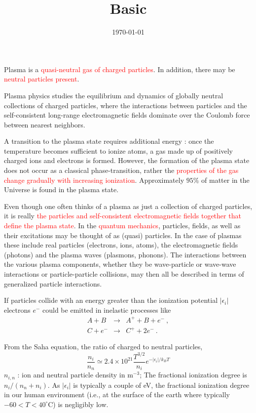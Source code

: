 \documentclass[12pt,a4paper]{article}
\title{Basic}
\author{}
\date{\today}
\begin{document}
\maketitle
Plasma is a \textcolor{red}{quasi-neutral gas of charged particles}. In addition, there may be \textcolor{red}{neutral particles present}.

\cite{2015bps..book.....C} Plasma physics studies the equilibrium and dynamics of globally neutral collections of charged particles, where the interactions between particles and the self-consistent long-range electromagnetic fields dominate over the Coulomb force between nearest neighbors.

A transition to the plasma state requires additional energy : once the temperature becomes sufficient to ionize atoms, a gas made up of positively charged ions and electrons is formed. However, the formation of the plasma state does not occur as a classical phase-transition, rather the \textcolor{red}{properties of the gas change gradually with increasing ionization}. Approximately $95 \%$ of matter in the Universe is found in the plasma state.

Even though one often thinks of a plasma as just a collection of charged particles, it is really \textcolor{red}{the particles and self-consistent electromagnetic fields together that define the plasma state}. In the \textcolor{red}{quantum mechanics}, particles, fields, as well as their excitations may be thought of as (quasi) particles. In the case of plasmas these include real particles (electrons, ions, atoms), the electromagnetic fields (photons) and the plasma waves (plasmons, phonons). The interactions between the various plasma components, whether they be wave-particle or wave-wave interactions or particle-particle collisions, may then all be described in terms of generalized particle interactions. 

If particles collide with an energy greater than the ionization potential $|\epsilon_i|$ electrons $e^-$ could be emitted in inelastic processes like
\begin{eqnarray*}
A + B &\rightarrow& A^+ + B + e^- ~, \\
C + e^- &\rightarrow& C^+ + 2e^- ~.
\end{eqnarray*}

From the Saha equation, the ratio of charged to neutral particles,
\begin{equation*}
\frac{n_i}{n_n} \simeq 2.4 \times 10^{21} \frac{T^{3/2}}{n_i} e^{-|\epsilon_i|/k_BT}
\end{equation*}
$n_{i,n}$ : ion and neutral particle density in m$^{-3}$; The fractional ionization degree is $n_i/(n_n + n_i)$. As $|\epsilon_i|$ is typically a couple of eV, the fractional ionization degree in our human environment (i.e., at the surface of the earth where typically $-60 < T < 40 ^{\circ}$C) is negligibly low.
\end{document}
